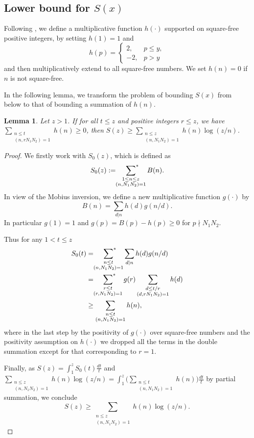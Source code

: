 \documentclass[10pt,leqno]{amsart}
\theoremstyle{plain}
\newtheorem{lemma}{Lemma}
\theoremstyle{definition}
\theoremstyle{remark}
\numberwithin{equation}{section}
\newcommand{\psum}{\sideset{}{^*}\sum}
\begin{document}
\subsection{Lower bound for $S(x)$}
Following \cite[Lemma A.2, Lemma A.3]{LuoZhouMR3928043}, we define a multiplicative function $h(\cdot)$ supported on square-free positive integers, by setting $h(1) = 1$ and
\[
h(p) =
\begin{cases}
  2,  & p \le y, \\
 -2,  & p > y
\end{cases}
\]
 and then multiplicatively extend to all square-free numbers. We set $h(n) = 0$ if $n$ is not square-free.
    
In the following lemma, we transform the problem of bounding $S(x)$ from below to that of bounding a summation of $h(n)$. 
\begin{lemma}\label{LowerBoundLemma}
    Let $z > 1$.
    If for all $t \leq z$ and positive integers $r \leq z$, we have $\sum_{\substack{n\leq t \\ (n,rN_1N_2)=1}}h(n) \geq 0$, then $S(z) \geq \sum_{\substack{n \leq z \\ (n,N_1N_2)=1}}h(n)\log(z/n)$.
\end{lemma}

\begin{proof}
    We firstly work with $S_0(z)$, which is defined as
    \[
        S_0(z) := \psum_{\substack{1 \leq n \leq z \\ (n,N_1N_2)=1}}B(n).
    \]
    In view of the Mobius inversion, we define a new multiplicative function $g(\cdot)$ by
    \[
        B(n) = \sum_{d|n}h(d)g(n/d).
    \]
    In particular $g(1) = 1$ and $g(p) = B(p) - h(p) \geq 0$ for $p\nmid N_1N_2$. 

    Thus for any $1 < t \leq z$
    \begin{align*}
        S_0(t) & = \psum_{\substack{n\leq t \\ (n,N_1N_2)=1}} \sum_{d|n}h(d)g(n/d) \\
        & = \psum_{\substack{r\leq t \\ (r,N_1N_2)=1}}g(r)\sum_{\substack{d\leq t/r\\ (d,rN_1N_2)=1}}h(d) \\
        & \geq \sum_{\substack{n\leq t \\ (n,N_1N_2)=1}}h(n),
    \end{align*}
    where in the last step by the positivity of $g(\cdot)$ over square-free numbers and the positivity assumption on $h(\cdot)$ we dropped all the terms in the double summation except for that corresponding to $r = 1$.

    Finally, as $S(z) = \int^{z}_1S_0(t)\frac{dt}{t}$ and 
    $\sum_{\substack{n\leq z\\ (n,N_1N_2)=1}}h(n)\log(z/n) = \int^{z}_1\big(\sum_{\substack{n\leq t\\ (n,N_1N_2)=1}}h(n)\big)\frac{dt}{t}$
    by partial summation, we conclude 
    \[
        S(z) \geq \sum_{\substack{n\leq z \\ (n,N_1N_2)=1}}h(n)\log(z/n).
    \]
\end{proof}
\end{document}
